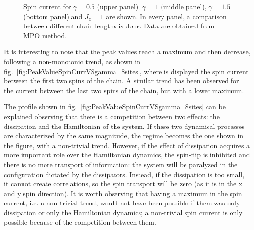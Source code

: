 \begin{figure}[H]
    \label{fig:16sites_LMvsGamma}
\captionsetup{width=1.\linewidth}
\caption{Spin current for $\gamma = 0.5$ (upper panel), $\gamma = 1$ (middle panel), $\gamma = 1.5$ (bottom panel) and $J_z = 1$ are shown. In every panel, a comparison between different chain lengths is done. Data are obtained from MPO method.}
\label{fig:spinCurrVSsizeVSgamma}
\end{figure}

It is interesting to note that the peak values reach a maximum and then decrease, following a non-monotonic trend, as shown in fig.~\ref{fig:PeakValueSpinCurrVSgamma_8sites}, where is displayed the spin current between the first two spins of the chain. A similar trend has been observed for the current between the last two spins of the chain, but with a lower maximum. 

The profile shown in fig.~\ref{fig:PeakValueSpinCurrVSgamma_8sites} can be explained observing that there is a competition between two effects: the dissipation and the Hamiltonian of the system. If these two dynamical processes are characterized by the same magnitude, the regime becomes the one shown in the figure, with a non-trivial trend. However, if the effect of dissipation acquires a more important role over the Hamiltonian dynamics, the spin-flip is inhibited and there is no more transport of information: the system will be paralyzed in the configuration dictated by the dissipators. Instead, if the dissipation is too small, it cannot create correlations, so the spin transport will be zero (as it is in the x and y spin direction). It is worth observing that having a maximum in the spin current, i.e. a non-trivial trend, would not have been possible if there was only dissipation or only the Hamiltonian dynamics; a non-trivial spin current is only possible because of the competition between them.


